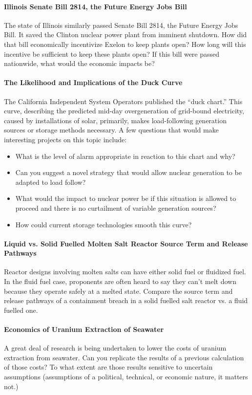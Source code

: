 \documentclass[12pts, answers]{exam}
\begin{document}
\paragraph{Illinois Senate Bill 2814, the Future Energy Jobs Bill} 
The state of Illinois similarly passed Senate Bill 2814, the Future Energy Jobs 
Bill. It saved the Clinton nuclear power plant from imminent shutdown. How did 
that bill economically incentivize Exelon to keep plants open? 
How long will this incentive be sufficient to keep these plants open?  If this 
bill were passed nationwide, what would the economic impacts be?

\paragraph{The Likelihood and Implications of the Duck Curve} The California
Independent System Operators published the ``duck chart.'' This curve,
describing the predicted mid-day overgeneration of grid-bound electricity,
caused by installations of solar, primarily, makes load-following generation
sources or storage methods necessary. A few questions that would make
interesting projects on this topic include:  
\begin{itemize}
\item What is the level of alarm appropriate in reaction to this chart and why? 
\item Can you suggest a novel strategy that would allow nuclear generation to
be adapted to load follow? 
\item What would the impact to nuclear power be if this situation is allowed to
proceed and there is no curtailment of variable generation sources? 
\item How could current storage technologies smooth this curve?
\end{itemize}

\paragraph{Liquid vs. Solid Fuelled Molten Salt Reactor Source Term and Release
Pathways} Reactor designs involving molten salts can have either solid fuel or
fluidized fuel. In the fluid fuel case, proponents are often heard to say they
can't melt down because they operate safely at a melted state. Compare the
source term and release pathways of a containment breach in a solid fuelled
salt reactor vs. a fluid fuelled one. 

\paragraph{Economics of Uranium Extraction of Seawater} A great deal of
research is being undertaken to lower the costs of uranium extraction from
seawater. Can you replicate the results of a previous calculation of those
costs? To what extent are those results sensitive to uncertain assumptions
(assumptions of a political, technical, or economic nature, it matters not.)
\end{document}
